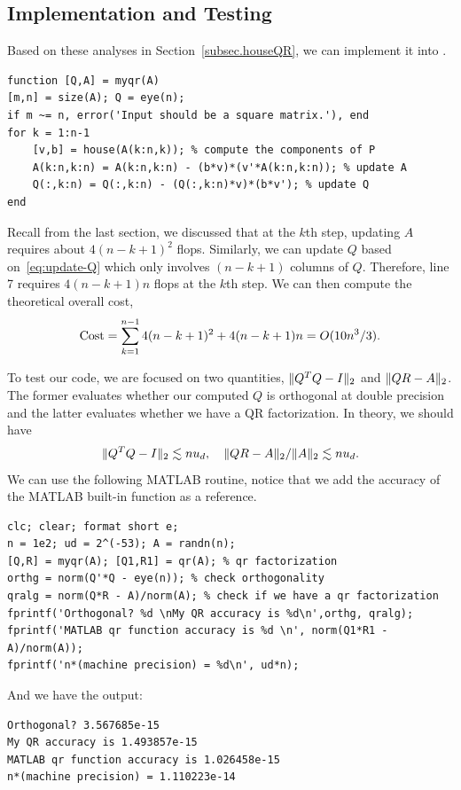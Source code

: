 \subsection{Implementation and Testing}\label{sec.qrtesting}
Based on these analyses in Section~\ref{subsec.houseQR}, we can implement it into \mat.

\begin{lstlisting}
function [Q,A] = myqr(A)
[m,n] = size(A); Q = eye(n);
if m ~= n, error('Input should be a square matrix.'), end
for k = 1:n-1
    [v,b] = house(A(k:n,k)); % compute the components of P
    A(k:n,k:n) = A(k:n,k:n) - (b*v)*(v'*A(k:n,k:n)); % update A
    Q(:,k:n) = Q(:,k:n) - (Q(:,k:n)*v)*(b*v'); % update Q
end
\end{lstlisting}

Recall from the last section, we discussed that at the $k$th step, updating $A$ requires about $4(n-k+1)^2$ flops. Similarly, we can update $Q$ based on~\eqref{eq:update-Q} which only involves $(n-k+1)$ columns of $Q$. Therefore, line 7 requires $4(n-k+1)n$ flops at the $k$th step. We can then compute the theoretical overall cost,
\begin{equation}\notag
    \text{Cost} = \sum_{k = 1}^{n-1} 4(n-k+1)^2 + 4(n-k+1)n = O(10n^3/3).
\end{equation}


To test our code, we are focused on two quantities, $\|{Q^T Q - I}\|_2$ and $\|{QR - A}\|_2$. The former evaluates whether our computed $Q$ is orthogonal at double precision and the latter evaluates whether we have a QR factorization. In theory, we should have 
\begin{equation}\notag
    \|{Q^T Q - I}\|_2 \lesssim nu_d, \quad \|{QR - A}\|_2/\|{A}\|_2 \lesssim nu_d.
\end{equation}
We can use the following MATLAB routine, notice that we add the accuracy of the MATLAB built-in function  as a reference.
\begin{lstlisting}
clc; clear; format short e; 
n = 1e2; ud = 2^(-53); A = randn(n); 
[Q,R] = myqr(A); [Q1,R1] = qr(A); % qr factorization
orthg = norm(Q'*Q - eye(n)); % check orthogonality
qralg = norm(Q*R - A)/norm(A); % check if we have a qr factorization
fprintf('Orthogonal? %d \nMy QR accuracy is %d\n',orthg, qralg);
fprintf('MATLAB qr function accuracy is %d \n', norm(Q1*R1 - A)/norm(A));
fprintf('n*(machine precision) = %d\n', ud*n);
\end{lstlisting}
And we have the output:
\begin{lstlisting}
Orthogonal? 3.567685e-15 
My QR accuracy is 1.493857e-15
MATLAB qr function accuracy is 1.026458e-15 
n*(machine precision) = 1.110223e-14
\end{lstlisting}

